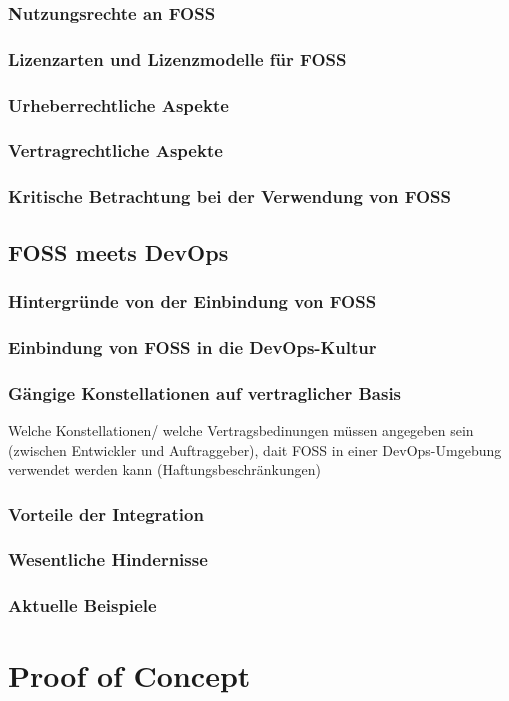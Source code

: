 \documentclass[12pt,titlepage]{article}
\begin{document}
\subsubsection{Nutzungsrechte an FOSS}
\subsubsection{Lizenzarten und Lizenzmodelle für FOSS}
\subsubsection{Urheberrechtliche Aspekte}
\subsubsection{Vertragrechtliche Aspekte}
\subsubsection{Kritische Betrachtung bei der Verwendung von FOSS}

\subsection{FOSS meets DevOps}
\subsubsection{Hintergründe von der Einbindung von FOSS}
\subsubsection{Einbindung von FOSS in die DevOps-Kultur}
\subsubsection{Gängige Konstellationen auf vertraglicher Basis}
Welche Konstellationen/ welche Vertragsbedinungen müssen angegeben sein (zwischen Entwickler und Auftraggeber), dait FOSS in einer DevOps-Umgebung verwendet werden kann (Haftungsbeschränkungen)
\subsubsection{Vorteile der Integration}
\subsubsection{Wesentliche Hindernisse}
\subsubsection{Aktuelle Beispiele}




\section{Proof of Concept}



\newpage


\end{document}
